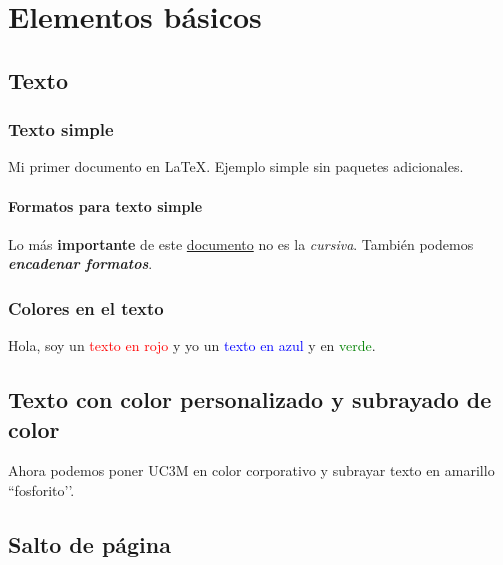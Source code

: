 \chapter{Elementos básicos}
\label{chap:básicos} %



\section{Texto}

\subsection{Texto simple}

Mi primer documento en \LaTeX. Ejemplo simple
sin paquetes adicionales.


\subsubsection{Formatos para texto simple}

Lo más \textbf{importante}
de este \underline{documento} 
no es la \textit{cursiva}.
También podemos \textbf{\textit{encadenar formatos}}.


\subsection{Colores en el texto}

Hola, soy un \textcolor{red}{texto en rojo} y yo un \textcolor{blue}{texto en azul} y en \textcolor{green}{verde}.


\section{Texto con color personalizado y subrayado de color}

Ahora podemos poner \textcolor{azulUC3M}{UC3M} en color corporativo y \colorbox{amarilloFosforito}{subrayar texto} en amarillo ``fosforito’’.


\section{Salto de página}

